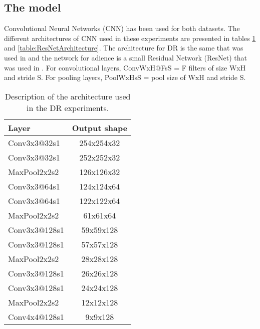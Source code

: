 \documentclass[journal]{IEEEtran}
\begin{document}
	\subsection{The model}
	\label{sect:model}
	Convolutional Neural Networks (CNN) has been used for both datasets. The different architectures of CNN used in these experiments are presented in tables \ref{table:CNNArchitecture} and \ref{table:ResNetArchitecture}. The architecture for DR is the same that was used in \cite{de2018weighted} and the network for adience is a small Residual Network (ResNet) \cite{he2016deep} that was used in \cite{beckham2017unimodal}. For convolutional layers, ConvWxH@FsS = F filters of size WxH and stride S. For pooling layers, PoolWxHsS = pool size of WxH and stride S.
	
	\begin{table}[!t]
		\caption{Description of the architecture used in the DR experiments.}
		\label{table:CNNArchitecture}
		\centering
		\begin{tabular}{|l|c|}
			\hline
			\textbf{Layer} & \textbf{Output shape}\\
			\hline
			Conv3x3@32s1 & 254x254x32\\\hline
			Conv3x3@32s1 & 252x252x32\\\hline
			MaxPool2x2s2 & 126x126x32\\\hline
			
			Conv3x3@64s1 & 124x124x64\\\hline
			Conv3x3@64s1 & 122x122x64\\\hline
			MaxPool2x2s2 & 61x61x64\\\hline
			
			Conv3x3@128s1 & 59x59x128\\\hline
			Conv3x3@128s1 & 57x57x128\\\hline
			MaxPool2x2s2 & 28x28x128\\\hline
			
			Conv3x3@128s1 & 26x26x128\\\hline
			Conv3x3@128s1 & 24x24x128\\\hline
			MaxPool2x2s2 & 12x12x128\\\hline
			
			Conv4x4@128s1 & 9x9x128\\
			\hline
		\end{tabular}	
	\end{table}
	
\end{document}
